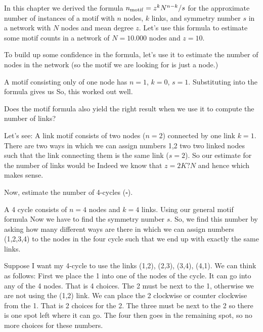 In this chapter we derived the formula $n_{\rm motif} = z^k N^{n-k}/s$ for the approximate number of instances of a motif with 
$n$ nodes, $k$ links, and symmetry number $s$ in a network with $N$ nodes and mean degree $z$. Let's use this formula to estimate some motif counts in a network of $N=10.000$ nodes and $z=10$. 

\subquestion 
To build up some confidence in the formula, let's use it to estimate the number of nodes in the network (so the motif we are looking for is just a node.)

\solution
A motif consisting only of one node has $n=1$, $k=0$, $s=1$. Substituting into the formula gives us
So, this worked out well. 

\subquestion 
Does the motif formula also yield the right result when we use it to compute the number of links?

\solution
Let's see: A link motif consists of two nodes ($n=2$) connected by one link $k=1$. There are two ways in which we can assign numbers 1,2 two two linked nodes such that the link connecting them is the same link ($s=2$). So our estimate for the number of links would be 
Indeed we know that $z=2K?N$ and hence 
which makes sense.

\subquestion
Now, estimate the number of 4-cycles ($\square$).

\solution
A 4 cycle consists of $n=4$ nodes and $k=4$ links. 
Using our general motif formula
Now we have to find the symmetry number $s$. So, we find this number by asking how many different ways are there in which we can assign numbers (1,2,3,4) to the nodes in the four cycle such that we end up with exactly the same links. 

Suppose I want my 4-cycle to use the links (1,2), (2,3), (3,4), (4,1). We can think as follows: First we place the 1 into one of the nodes of the cycle. It can go into any of the 4 nodes. That is 4 choices. The 2 must be next to the 1, otherwise we are not using the (1,2) link. We can place the 2 clockwise or counter clockwise from the 1. That is 2 choices for the 2. The three must be next to the 2 so there is one spot left where it can go. The four then goes in the remaining spot, so no more choices for these numbers. 

